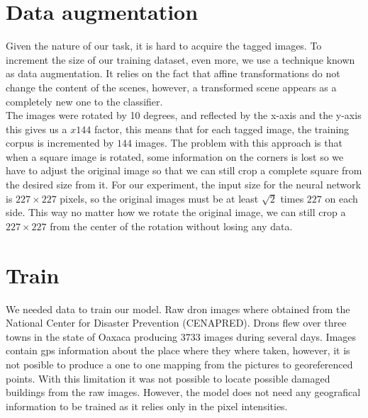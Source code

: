 \section{Data augmentation}

Given the nature of our task, it is hard to acquire the tagged images. To increment the size of our training dataset, even more, we use a technique known as data augmentation. It relies on the fact that affine transformations do not change the content of the scenes, however, a transformed scene appears as a completely new one to the classifier.\\

The images were rotated by 10 degrees, and reflected by the x-axis and the y-axis this gives us a $x144$ factor, this means that for each tagged image, the training corpus is incremented by $144$ images. The problem with this approach is that when a square image is rotated, some information on the corners is lost so we have to adjust the original image so that we can still crop a complete square from the desired size from it. For our experiment, the input size for the neural network is $227\times 227$ pixels, so the original images must be at least $\sqrt{2}$ times $227$ on each side. This way no matter how we rotate the original image, we can still crop a $227\times 227$ from the center of the rotation without losing any data.\\



\section{Train}

We needed data to train our model. Raw dron images where obtained from the National Center for Disaster Prevention (CENAPRED). Drons flew over three towns in the state of Oaxaca producing $3733$ images during several days. Images contain gps information about the place where they where taken, however, it is not posible to produce a one to one mapping from the pictures to georeferenced points. With this limitation it was not possible to locate possible damaged buildings from the raw images. However, the model does not need any geografical information to be trained as it relies only in the pixel intensities.




